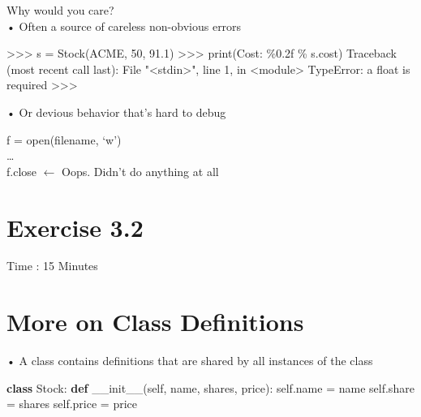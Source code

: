 \documentclass[
  letterpaper,
  DIV=11,
  numbers=noendperiod]{scrreprt}
\newenvironment{Shaded}{\begin{snugshade}}{\end{snugshade}}
\newcommand{\FunctionTok}[1]{\textcolor[rgb]{0.28,0.35,0.67}{#1}}
\newcommand{\KeywordTok}[1]{\textcolor[rgb]{0.00,0.23,0.31}{\textbf{#1}}}
\newcommand{\NormalTok}[1]{\textcolor[rgb]{0.00,0.23,0.31}{#1}}
\newcommand{\OperatorTok}[1]{\textcolor[rgb]{0.37,0.37,0.37}{#1}}
\newcommand{\VariableTok}[1]{\textcolor[rgb]{0.07,0.07,0.07}{#1}}
\begin{document}
Why would you care?\\
• Often a source of careless non-obvious errors

\begin{Shaded}
\begin{Highlighting}[]
\NormalTok{\textgreater{}\textgreater{}\textgreater{} s = Stock(\textquotesingle{}ACME\textquotesingle{}, 50, 91.1)  }
\NormalTok{\textgreater{}\textgreater{}\textgreater{} print(\textquotesingle{}Cost: \%0.2f\textquotesingle{} \% s.cost)  }
\NormalTok{Traceback (most recent call last):  }
\NormalTok{    File "\textless{}stdin\textgreater{}", line 1, in \textless{}module\textgreater{}  }
\NormalTok{TypeError: a float is required  }
\NormalTok{\textgreater{}\textgreater{}\textgreater{} }
\end{Highlighting}
\end{Shaded}

• Or devious behavior that's hard to debug

f = open(filename, `w')\\
\ldots{}\\
f.close \(\leftarrow\) Oops. Didn't do anything at all


\chapter{Exercise 3.2}\label{exercise-3.2}

Time : 15 Minutes


\chapter{More on Class Definitions}\label{more-on-class-definitions}

• A class contains definitions that are shared by all instances of the
class

\begin{Shaded}
\begin{Highlighting}[]
\KeywordTok{class}\NormalTok{ Stock: }\KeywordTok{def} \FunctionTok{\_\_init\_\_}\NormalTok{(}\VariableTok{self}\NormalTok{, name, shares, price): }\VariableTok{self}\NormalTok{.name }\OperatorTok{=}\NormalTok{ name }\VariableTok{self}\NormalTok{.share }\OperatorTok{=}\NormalTok{ shares }\VariableTok{self}\NormalTok{.price }\OperatorTok{=}\NormalTok{ price }
\end{Highlighting}
\end{Shaded}
\end{document}
